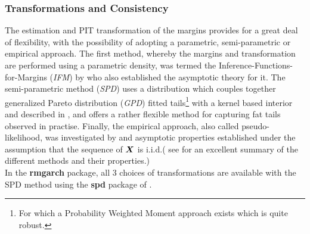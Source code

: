 \subsubsection{Transformations and Consistency}\label{II:transformation}
The estimation and PIT transformation of the margins provides for a great deal of
flexibility, with the possibility of adopting a parametric, semi-parametric or
empirical approach. The first method, whereby the margins and transformation are
performed using a parametric density, was termed the Inference-Functions-for-Margins
(\emph{IFM}) by \cite{Joe1997} who also established the asymptotic theory
for it. The semi-parametric method (\emph{SPD}) uses a distribution which couples
together generalized Pareto distribution (\emph{GPD}) fitted tails\footnote{For
which a Probability Weighted Moment approach exists which is quite robust.} with
a kernel based interior and described in \cite{Davison1990}, and offers a rather
flexible method for capturing fat tails observed in practise. Finally, the empirical
approach, also called pseudo-likelihood, was investigated by \cite{Genest1995}
and asymptotic properties established under the assumption that the sequence
of $\mbox{\boldmath$X$}$ is i.i.d.( see \cite{Durrleman2000} for an excellent summary of the
different methods and their properties.)\\
In the {\bf rmgarch} package, all 3 choices of transformations are available with
the SPD method using the {\bf spd} package of \cite{Ghalanos2012c}.

